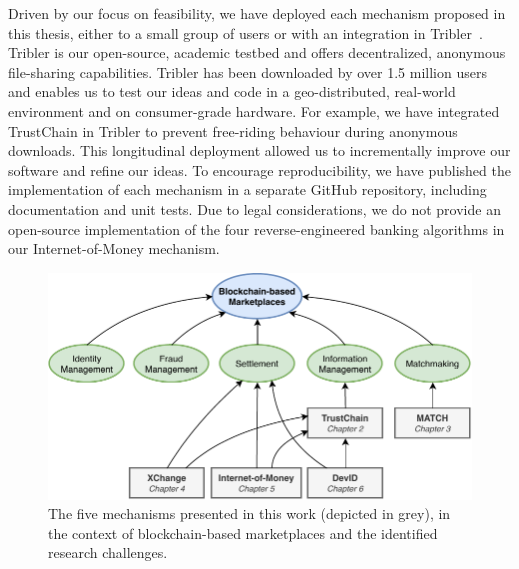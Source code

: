 Driven by our focus on feasibility, we have deployed each mechanism proposed in this thesis, either to a small group of users or with an integration in Tribler~\cite{zeilemaker2011tribler}.
Tribler is our open-source, academic testbed and offers decentralized, anonymous file-sharing capabilities.
Tribler has been downloaded by over 1.5 million users and enables us to test our ideas and code in a geo-distributed, real-world environment and on consumer-grade hardware.
For example, we have integrated TrustChain in Tribler to prevent free-riding behaviour during anonymous downloads.
This longitudinal deployment allowed us to incrementally improve our software and refine our ideas.
To encourage reproducibility, we have published the implementation of each mechanism in a separate GitHub repository, including documentation and unit tests.
Due to legal considerations, we do not provide an open-source implementation of the four reverse-engineered banking algorithms in our Internet-of-Money mechanism.






\begin{figure}[t]
	\centering
	\includegraphics[width=\linewidth]{introduction/assets/thesis_overview}
	\caption{The five mechanisms presented in this work (depicted in grey), in the context of blockchain-based marketplaces and the identified research challenges.}
	\label{fig:thesis_overview}
\end{figure}

